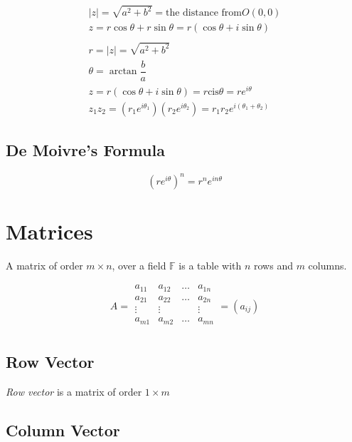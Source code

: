 \documentclass[fleqn]{article}
\begin{document}
\begin{align*}
\lvert z \rvert = \sqrt{a^2 + b^2} =  \text{the distance from} O(0,0) \nonumber \\
z = r \cos \theta + r \sin \theta = r(\cos \theta + i \sin \theta)\\
\\r = \lvert z \rvert = \sqrt{a^2 + b^2}\\
\theta = \arctan \dfrac{b}{a}\\
z = r(\cos \theta + i \sin \theta) = r \text{cis} \theta = r e^{i \theta}\\
z_1 z_2 = (r_1 e^{i \theta_1})(r_2 e^{i \theta_2}) = r_1 r_2 e^{i(\theta_1 + \theta_2)}
\end{align*}

\subsection{De Moivre's Formula}

\begin{equation*}
	(r e^{i \theta})^n = r^n e^{i n \theta}
\end{equation*}

\newpage
\section{Matrices}

A matrix of order $m \times n$, over a field $\mathbb{F}$ is a table with $n$ rows and $m$ columns.

\begin{equation*}
A =
\begin{matrix}

a_{11} & a_{12} & \dots & a_{1n}\\	
a_{21} & a_{22} & \dots & a_{2n}\\
\vdots & \vdots & & \vdots\\
a_{m1} & a_{m2} & \dots & a_{mn}\\
\end{matrix}
= (a_{ij})
\end{equation*}

\subsection{Row Vector}

\emph{Row vector} is a matrix of order $1 \times m$\\

\subsection{Column Vector}
\end{document}
